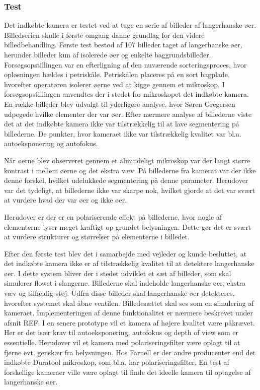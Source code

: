 \subsubsection{Test}
Det indkøbte kamera er testet ved at tage en serie af billeder af langerhanske øer. Billedserien skulle i første omgang danne grundlag for den videre billedbehandling. Første test bestod af 107 billeder taget af langerhanske øer, herunder billeder kun af isolerede øer og enkelte baggrundsbilleder. Forsøgsopstillingen var en efterligning af den nuværende sorteringsproces, hvor opløsningen hældes i petriskåle. Petriskålen placeres på en sort bagplade, hvorefter operatøren isolerer øerne ved at kigge gennem et mikroskop. I forsøgsopstillingen anvendtes der i stedet for mikroskopet det indkøbte kamera. En række billeder blev udvalgt til yderligere analyse, hvor Søren Gregersen udpegede hvilke elementer der var øer. Efter nærmere analyse af billederne viste det at det indkøbte kamera ikke var tilstrækkelig til at lave segmentering på billederne. De punkter, hvor kameraet ikke var tilstrækkelig kvalitet var bl.a. autoeksponering og autofokus.

Når øerne blev observeret gennem et almindeligt mikroskop var der langt større kontrast i mellem øerne og det ekstra væv. På billederne fra kamerat var der ikke denne forskel, hvilket udelukkede segmentering på denne parameter. Herudover var det tydeligt, at billederne ikke var skarpe nok, hvilket gjorde at det var svært at vurdere hvad der var øer og ikke øer.

Herudover er der er en polariserende effekt på billederne, hvor nogle af elementerne lyser meget kraftigt op grundet belysningen. Dette gør det er svært at vurdere strukturer og størrelser på elementerne i billedet. 

Efter den første test blev det i samarbejde med vejleder og kunde besluttet, at det indkøbte kamera ikke er af tilstrækkelig kvalitet til at detektere langerhanske øer. I dette system bliver der i stedet udviklet et sæt af billeder, som skal simulerer flowet i slangerne. Billederne skal indeholde langerhanske øer, ekstra væv og tilfældig støj. Udfra disse billeder skal langerhanske øer detekteres, hvorefter systemet skal åbne ventilen. Billedesættet skal ses som en simulering af kameraet. Implementeringen af denne funktionalitet er nærmere beskrevet under afsnit REF. I en senere prototype vil et kamera af højere kvalitet være påkrævet. Her er det især krav til autoeksponering, autofokus og depth of view som er essentielle. Herudover vil et kamera med polariseringsfilter være oplagt til at fjerne evt. genskær fra belysningen. Hos Farnell er der andre producenter end det indkøbte Duratool mikroskop, som bl.a. har polariseringsfilter. En test af forskellige kameraer ville være oplagt til finde det ideelle kamera til optagelse af langerhanske øer. 